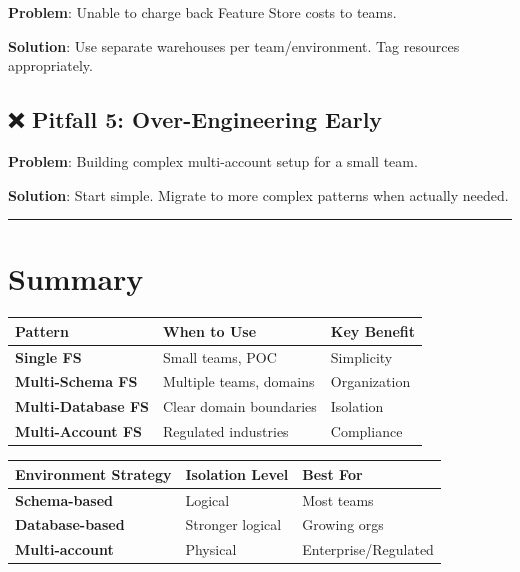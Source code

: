 \documentclass[
  letterpaper,
  DIV=11,
  numbers=noendperiod]{scrreprt}
\begin{document}
\textbf{Problem}: Unable to charge back Feature Store costs to teams.

\textbf{Solution}: Use separate warehouses per team/environment. Tag
resources appropriately.

\hypertarget{pitfall-5-over-engineering-early}{%
\subsection{❌ Pitfall 5: Over-Engineering
Early}\label{pitfall-5-over-engineering-early}}

\textbf{Problem}: Building complex multi-account setup for a small team.

\textbf{Solution}: Start simple. Migrate to more complex patterns when
actually needed.

\begin{center}\rule{0.5\linewidth}{0.5pt}\end{center}

\hypertarget{summary-1}{%
\section{Summary}\label{summary-1}}

\begin{longtable}[]{@{}lll@{}}
\toprule\noalign{}
Pattern & When to Use & Key Benefit \\
\midrule\noalign{}
\endhead
\bottomrule\noalign{}
\endlastfoot
\textbf{Single FS} & Small teams, POC & Simplicity \\
\textbf{Multi-Schema FS} & Multiple teams, domains & Organization \\
\textbf{Multi-Database FS} & Clear domain boundaries & Isolation \\
\textbf{Multi-Account FS} & Regulated industries & Compliance \\
\end{longtable}

\begin{longtable}[]{@{}lll@{}}
\toprule\noalign{}
Environment Strategy & Isolation Level & Best For \\
\midrule\noalign{}
\endhead
\bottomrule\noalign{}
\endlastfoot
\textbf{Schema-based} & Logical & Most teams \\
\textbf{Database-based} & Stronger logical & Growing orgs \\
\textbf{Multi-account} & Physical & Enterprise/Regulated \\
\end{longtable}
\end{document}
